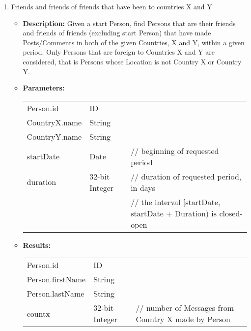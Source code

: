 {\begin{enumerate}
                \item Friends and friends of friends that have been to countries X and Y
                    \begin{itemize}
                        \item \textbf{Description:}
                            Given a start Person, find Persons that are their friends and
                            friends of friends (excluding start Person) that have made
                            Posts/Comments in both of the given Countries, X and Y, within a
                            given period.  Only Persons that are foreign to Countries X and Y
                            are considered, that is Persons whose Location is not Country X or
                            Country Y.    
                        \item \textbf{Parameters:} \\
                            \begin{tabular}{lll}
                                Person.id 										& ID & \\
                                CountryX.name									& String & \\
                                CountryY.name									& String & \\
                                startDate										& Date 	& // beginning of requested period \\
                                duration										& 32-bit Integer 					& // duration of requested period, in days \\
                                                  &                                   & // the interval [startDate, startDate + Duration) is closed-open\\
                            \end{tabular}		
                        \item \textbf{Results:} \\
                            \begin{tabular}{lll}
                                Person.id 										& ID 	& \\
                                Person.firstName 								& String 			& \\
                                Person.lastName 								& String 			& \\
                                countx 											& 32-bit Integer 	&
                                \parbox[t]{20cm}{// number of Messages from Country X made by Person \par 
}
\end{tabular}
\end{itemize}
\end{enumerate}}

